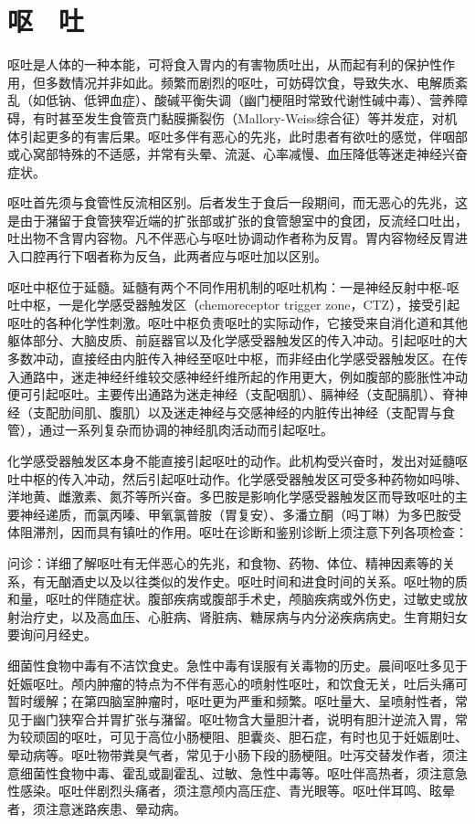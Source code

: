 \chapter{呕　吐}

呕吐是人体的一种本能，可将食入胃内的有害物质吐出，从而起有利的保护性作用，但多数情况并非如此。频繁而剧烈的呕吐，可妨碍饮食，导致失水、电解质紊乱（如低钠、低钾血症）、酸碱平衡失调（幽门梗阻时常致代谢性碱中毒）、营养障碍，有时甚至发生食管贲门黏膜撕裂伤（Mallory-Weiss综合征）等并发症，对机体引起更多的有害后果。呕吐多伴有恶心的先兆，此时患者有欲吐的感觉，伴咽部或心窝部特殊的不适感，并常有头晕、流涎、心率减慢、血压降低等迷走神经兴奋症状。

呕吐首先须与食管性反流相区别。后者发生于食后一段期间，而无恶心的先兆，这是由于潴留于食管狭窄近端的扩张部或扩张的食管憩室中的食团，反流经口吐出，吐出物不含胃内容物。凡不伴恶心与呕吐协调动作者称为反胃。胃内容物经反胃进入口腔再行下咽者称为反刍，此两者应与呕吐加以区别。

呕吐中枢位于延髓。延髓有两个不同作用机制的呕吐机构：一是神经反射中枢-呕吐中枢，一是化学感受器触发区（chemoreceptor
trigger
zone，CTZ），接受引起呕吐的各种化学性刺激。呕吐中枢负责呕吐的实际动作，它接受来自消化道和其他躯体部分、大脑皮质、前庭器官以及化学感受器触发区的传入冲动。引起呕吐的大多数冲动，直接经由内脏传入神经至呕吐中枢，而非经由化学感受器触发区。在传入通路中，迷走神经纤维较交感神经纤维所起的作用更大，例如腹部的膨胀性冲动便可引起呕吐。主要传出通路为迷走神经（支配咽肌）、膈神经（支配膈肌）、脊神经（支配肋间肌、腹肌）以及迷走神经与交感神经的内脏传出神经（支配胃与食管），通过一系列复杂而协调的神经肌肉活动而引起呕吐。

化学感受器触发区本身不能直接引起呕吐的动作。此机构受兴奋时，发出对延髓呕吐中枢的传入冲动，然后引起呕吐动作。化学感受器触发区可受多种药物如吗啡、洋地黄、雌激素、氮芥等所兴奋。多巴胺是影响化学感受器触发区而导致呕吐的主要神经递质，而氯丙嗪、甲氧氯普胺（胃复安）、多潘立酮（吗丁啉）为多巴胺受体阻滞剂，因而具有镇吐的作用。呕吐在诊断和鉴别诊断上须注意下列各项检查：

问诊：详细了解呕吐有无伴恶心的先兆，和食物、药物、体位、精神因素等的关系，有无酗酒史以及以往类似的发作史。呕吐时间和进食时间的关系。呕吐物的质和量，呕吐的伴随症状。腹部疾病或腹部手术史，颅脑疾病或外伤史，过敏史或放射治疗史，以及高血压、心脏病、肾脏病、糖尿病与内分泌疾病病史。生育期妇女要询问月经史。

细菌性食物中毒有不洁饮食史。急性中毒有误服有关毒物的历史。晨间呕吐多见于妊娠呕吐。颅内肿瘤的特点为不伴有恶心的喷射性呕吐，和饮食无关，吐后头痛可暂时缓解；在第四脑室肿瘤时，呕吐更为严重和频繁。呕吐量大、呈喷射性者，常见于幽门狭窄合并胃扩张与潴留。呕吐物含大量胆汁者，说明有胆汁逆流入胃，常为较顽固的呕吐，可见于高位小肠梗阻、胆囊炎、胆石症，有时也见于妊娠剧吐、晕动病等。呕吐物带粪臭气者，常见于小肠下段的肠梗阻。吐泻交替发作者，须注意细菌性食物中毒、霍乱或副霍乱、过敏、急性中毒等。呕吐伴高热者，须注意急性感染。呕吐伴剧烈头痛者，须注意颅内高压症、青光眼等。呕吐伴耳鸣、眩晕者，须注意迷路疾患、晕动病。

